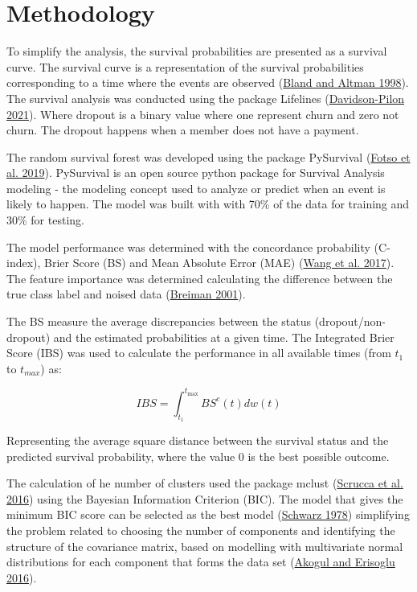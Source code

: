 \documentclass[
  12pt,
]{article}
\begin{document}
\hypertarget{methodology}{%
\section{Methodology}\label{methodology}}

To simplify the analysis, the survival probabilities are presented as a survival curve.
The survival curve is a representation of the survival probabilities corresponding to a
time where the events are observed (\protect\hyperlink{ref-Bland_Altman_1998}{Bland and Altman 1998}).
The survival analysis was conducted using the package Lifelines (\protect\hyperlink{ref-Pilon_2021}{Davidson-Pilon 2021}).
Where dropout is a binary value where one represent churn and zero not churn. The
dropout happens when a member does not have a payment.

The random survival forest was developed using the package PySurvival
(\protect\hyperlink{ref-Fotso_others_2019}{Fotso et al. 2019}). PySurvival is an open source python package for
Survival Analysis modeling - the modeling concept used to analyze or predict
when an event is likely to happen.
The model was built with with 70\% of the data for training and 30\% for testing.

The model performance was determined with the concordance probability (C-index),
Brier Score (BS) and Mean Absolute Error (MAE) (\protect\hyperlink{ref-wangmachine2017}{Wang et al. 2017}). The feature
importance was determined calculating the difference between the true class
label and noised data (\protect\hyperlink{ref-Breiman_2001}{Breiman 2001}).

The BS measure the average discrepancies between the status (dropout/non-dropout)
and the estimated probabilities at a given time.
The Integrated Brier Score (IBS) was used to calculate the performance
in all available times (from \(t_1\) to \(t_{max}\)) as:

\begin{equation}
IBS = \int_{t_1}^{t_\text{max}} {BS}^c(t) d w(t)
\end{equation}

Representing the average square distance between the survival status and the
predicted survival probability, where the value 0 is the best possible outcome.

The calculation of he number of clusters used the package mclust (\protect\hyperlink{ref-scrucca2016}{Scrucca et al. 2016})
using the Bayesian Information Criterion (BIC). The model that gives the minimum
BIC score can be selected as the best model (\protect\hyperlink{ref-schwarz1978}{Schwarz 1978}) simplifying the
problem related to choosing the number of components and identifying the
structure of the covariance matrix, based on modelling with multivariate normal
distributions for each component that forms the data set (\protect\hyperlink{ref-akogul2016}{Akogul and Erisoglu 2016}).
\end{document}
